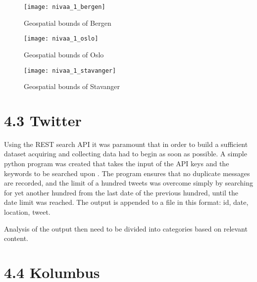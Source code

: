\begin{figure}[ht]
\texttt{[image: nivaa\_1\_bergen]}
\centering
\caption{Geospatial bounds of Bergen}
\label{fig:boundsbergen}
\end{figure}

\begin{figure}[ht]
\texttt{[image: nivaa\_1\_oslo]}
\centering
\caption{Geospatial bounds of Oslo}
\label{fig:boundsoslo}
\end{figure}

\begin{figure}[ht]
\texttt{[image: nivaa\_1\_stavanger]}
\centering
\caption{Geospatial bounds of Stavanger}
\label{fig:boundsstavanger}
\end{figure}

\newpage\newpage

\section*{4.3 Twitter}
Using the REST search API it was paramount that in order to build a sufficient dataset acquiring and collecting data had to begin as soon as possible. A simple python program was created that takes the input of the API keys and the keywords to be searched upon . The program ensures that no duplicate messages are recorded, and the limit of a hundred tweets was overcome simply by searching for yet another hundred from the last date of the previous hundred, until the date limit was reached.
The output is appended to a file in this format: id, date, location, tweet.

Analysis of the output then need to be divided into categories based on relevant content.

\section*{4.4 Kolumbus}